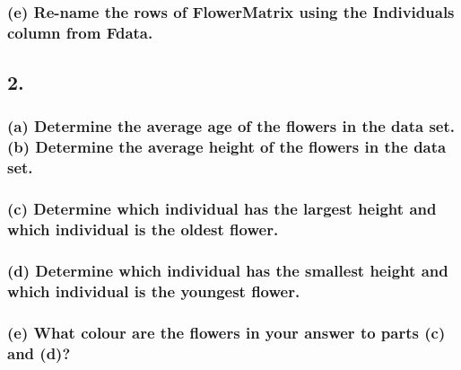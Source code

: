 \documentclass[
]{article}
\begin{document}
\hypertarget{e-re-name-the-rows-of-flowermatrix-using-the-individuals-column-from-fdata.}{%
\subsubsection{(e) Re-name the rows of FlowerMatrix using the
Individuals column from
Fdata.}\label{e-re-name-the-rows-of-flowermatrix-using-the-individuals-column-from-fdata.}}

\hypertarget{section}{%
\subsection{2.}\label{section}}

\hypertarget{a-determine-the-average-age-of-the-flowers-in-the-data-set.-b-determine-the-average-height-of-the-flowers-in-the-data-set.}{%
\subsubsection{(a) Determine the average age of the flowers in the data
set. (b) Determine the average height of the flowers in the data
set.}\label{a-determine-the-average-age-of-the-flowers-in-the-data-set.-b-determine-the-average-height-of-the-flowers-in-the-data-set.}}

\hypertarget{c-determine-which-individual-has-the-largest-height-and-which-individual-is-the-oldest-flower.}{%
\subsubsection{(c) Determine which individual has the largest height and
which individual is the oldest
flower.}\label{c-determine-which-individual-has-the-largest-height-and-which-individual-is-the-oldest-flower.}}

\hypertarget{d-determine-which-individual-has-the-smallest-height-and-which-individual-is-the-youngest-flower.}{%
\subsubsection{(d) Determine which individual has the smallest height
and which individual is the youngest
flower.}\label{d-determine-which-individual-has-the-smallest-height-and-which-individual-is-the-youngest-flower.}}

\hypertarget{e-what-colour-are-the-flowers-in-your-answer-to-parts-c-and-d}{%
\subsubsection{(e) What colour are the flowers in your answer to parts
(c) and
(d)?}\label{e-what-colour-are-the-flowers-in-your-answer-to-parts-c-and-d}}
\end{document}
